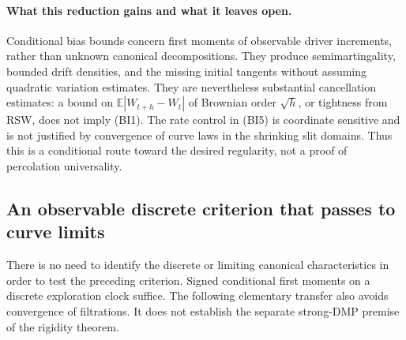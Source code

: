 \documentclass[11pt]{article}
\theoremstyle{definition}\newtheorem{definition}[theorem]{Definition}
\theoremstyle{remark}\newtheorem{remark}[theorem]{Remark}
\begin{document}
\paragraph{What this reduction gains and what it leaves open.}
Conditional bias bounds concern first moments of observable driver
increments, rather than unknown canonical decompositions. They produce
semimartingality, bounded drift densities, and the missing initial tangents
without assuming quadratic variation estimates. They are nevertheless
substantial cancellation estimates: a bound on
$\mathbb E|W_{t+h}-W_t|$ of Brownian order $\sqrt h$, or tightness from
RSW, does not imply (BI1). The rate control in (BI5) is coordinate sensitive
and is not justified by convergence of curve laws in the shrinking slit
domains. Thus this is a conditional route toward the desired regularity,
not a proof of percolation universality.

\subsection{An observable discrete criterion that passes to curve limits}
\label{sec:discrete-bias-transfer}

There is no need to identify the discrete or limiting canonical
characteristics in order to test the preceding criterion. Signed
conditional first moments on a discrete exploration clock suffice.
The following elementary transfer also avoids convergence of filtrations.
It does not establish the separate strong-DMP premise of the rigidity
theorem.
\end{document}
